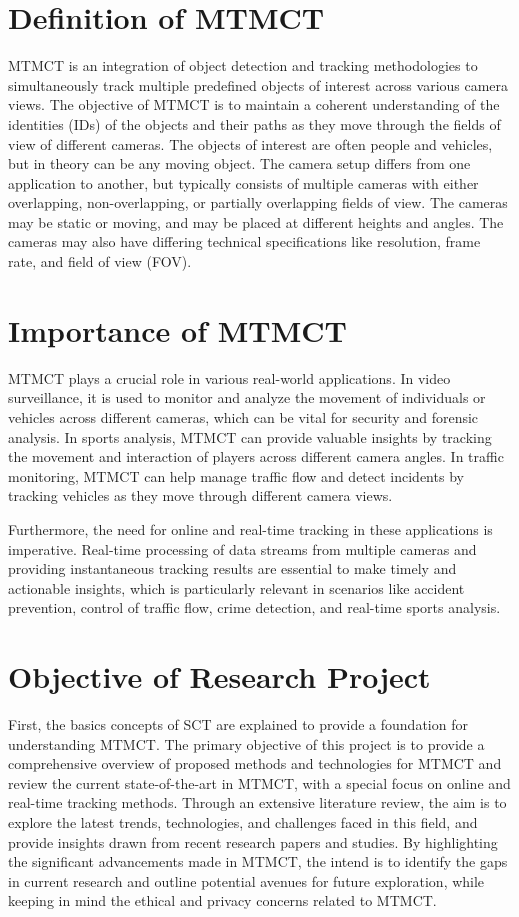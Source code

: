 \section{Definition of MTMCT}\label{sec:definition_of_mtmct}
MTMCT is an integration of object detection and tracking methodologies to simultaneously track multiple predefined objects of interest across various camera views. The objective of MTMCT is to maintain a coherent understanding of the identities (IDs) of the objects and their paths as they move through the fields of view of different cameras. The objects of interest are often people and vehicles, but in theory can be any moving object. The camera setup differs from one application to another, but typically consists of multiple cameras with either overlapping, non-overlapping, or partially overlapping fields of view. The cameras may be static or moving, and may be placed at different heights and angles. The cameras may also have differing technical specifications like resolution, frame rate, and field of view (FOV).

\section{Importance of MTMCT}\label{sec:importance_of_mtmct}
MTMCT plays a crucial role in various real-world applications. In video surveillance, it is used to monitor and analyze the movement of individuals or vehicles across different cameras, which can be vital for security and forensic analysis. In sports analysis, MTMCT can provide valuable insights by tracking the movement and interaction of players across different camera angles. In traffic monitoring, MTMCT can help manage traffic flow and detect incidents by tracking vehicles as they move through different camera views.

Furthermore, the need for online and real-time tracking in these applications is imperative. Real-time processing of data streams from multiple cameras and providing instantaneous tracking results are essential to make timely and actionable insights, which is particularly relevant in scenarios like accident prevention, control of traffic flow, crime detection, and real-time sports analysis.

\section{Objective of Research Project}\label{sec:objective_of_review}
First, the basics concepts of SCT are explained to provide a foundation for understanding MTMCT. The primary objective of this project is to provide a comprehensive overview of proposed methods and technologies for MTMCT and review the current state-of-the-art in MTMCT, with a special focus on online and real-time tracking methods. Through an extensive literature review, the aim is to explore the latest trends, technologies, and challenges faced in this field, and provide insights drawn from recent research papers and studies. By highlighting the significant advancements made in MTMCT, the intend is to identify the gaps in current research and outline potential avenues for future exploration, while keeping in mind the ethical and privacy concerns related to MTMCT.

